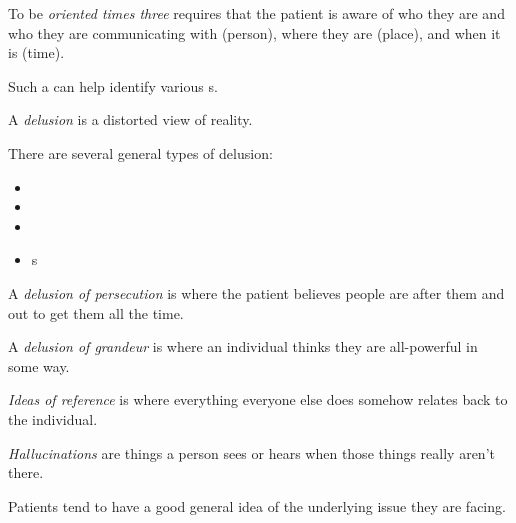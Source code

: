 \begin{definition}\label{def:Oriented_Times_Three}
  To be \emph{oriented times three} requires that the patient is aware of who they are and who they are communicating with (person), where they are (place), and when it is (time).
\end{definition}

Such a  can help identify various s.

\begin{definition}[Delusion]\label{def:Delusion}
  A \emph{delusion} is a distorted view of reality.

  There are several general types of delusion:
  \begin{itemize}[noitemsep]
  \item {}
  \item {}
  \item {}
  \item {}s
  \end{itemize}
\end{definition}

\begin{definition}\label{def:Delusion_of_Persecution}
  A \emph{delusion of persecution} is where the patient believes people are after them and out to get them all the time.
\end{definition}

\begin{definition}\label{def:Delusion_of_Grandeur}
  A \emph{delusion of grandeur} is where an individual thinks they are all-powerful in some way.
\end{definition}

\begin{definition}\label{def:Ideas_of_Reference}
   \emph{Ideas of reference} is where everything everyone else does somehow relates back to the individual.
\end{definition}

\begin{definition}[Hallucination]\label{def:Hallucination}
  \emph{Hallucinations} are things a person sees or hears when those things really aren't there.
\end{definition}

\begin{remark*}
  Patients tend to have a good general idea of the underlying issue they are facing.
\end{remark*}

